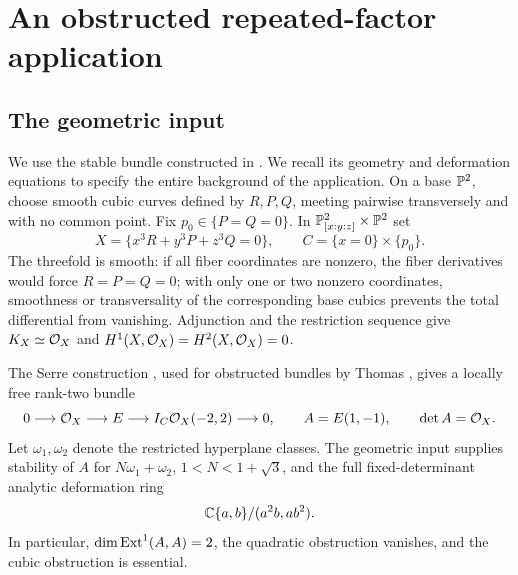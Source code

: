 \section{An obstructed repeated-factor application}\label{sec:application}

\subsection{The geometric input}
We use the stable bundle constructed in
\cite[Section~6]{wuebben15}. We recall its geometry
and deformation equations to specify the entire
background of the application.
On a base $\mathbb P^2$, choose smooth cubic curves
defined by $R,P,Q$, meeting pairwise transversely
and with no common point. Fix $p_0\in\{P=Q=0\}$.
In $\mathbb P^2_{[x:y:z]}\times\mathbb P^2$ set
\begin{equation}\label{eq:bicubic}
 X=\{x^3R+y^3P+z^3Q=0\},\qquad
 C=\{x=0\}\times\{p_0\}.
\end{equation}
The threefold is smooth: if all fiber coordinates
are nonzero, the fiber derivatives would force
$R=P=Q=0$; with only one or two nonzero coordinates,
smoothness or transversality of the corresponding
base cubics prevents the total differential from
vanishing. Adjunction and the restriction sequence
give $K_X\simeq\mathcal O_X$ and
$H^1(X,\mathcal O_X)=H^2(X,\mathcal O_X)=0$.

The Serre construction \cite{arrondo}, used for obstructed
bundles by Thomas \cite{thomas}, gives a locally free rank-two
bundle
\begin{equation}\label{eq:serre-bundle}
 0\longrightarrow\mathcal O_X\longrightarrow E
       \longrightarrow I_C\mathcal O_X(-2,2)\longrightarrow0,
 \qquad A=E(1,-1),\qquad \det A=\mathcal O_X.
\end{equation}
Let $\omega_1,\omega_2$ denote the restricted hyperplane
classes. The geometric input supplies stability of $A$
for $N\omega_1+\omega_2$, $1<N<1+\sqrt3$, and the full
fixed-determinant analytic deformation ring
\begin{equation}\label{eq:scalar-germ}
 \mathbb C\{a,b\}/(a^2b,ab^2).
\end{equation}
In particular, $\dim\operatorname{Ext}^1(A,A)=2$, the quadratic
obstruction vanishes, and the cubic obstruction is
essential.

